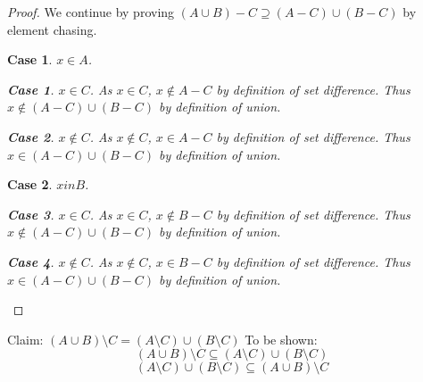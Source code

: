 \documentclass[12pt]{article}
\newtheorem{case}{Case}
\newtheorem{subcase}{Case}
\numberwithin{subcase}{case}
\begin{document}
\begin{proof}
We continue by proving $(A\cup B) - C \supseteq (A - C) \cup (B - C)$ by element chasing.
\begin{case}
$x \in A$. 
\begin{subcase}
  $x \in C$. As $x \in C$, $x \not\in A - C$ by definition of set difference. Thus $x \not\in (A - C) \cup (B
  - C)$ by definition of union.
\end{subcase}
\begin{subcase}
  $x \not\in C$. As $x \not\in C$, $x \in A - C$ by definition of set difference. Thus $x \in (A - C) \cup (B
  - C)$ by definition of union.
\end{subcase}
\end{case}
\begin{case}
  $x in B$.
  \begin{subcase}
    $x \in C$. As $x \in C$, $x \not \in B - C$ by definition of set difference. Thus $x \not\in (A - C) \cup (B
    - C)$ by definition of union.
  \end{subcase}
  \begin{subcase}
    $x \not \in C$. As $x \not \in C$, $x \in B - C$ by definition of set difference. Thus $x \in (A - C) \cup
    (B - C)$ by definition of union.
  \end{subcase}
\end{case}
\end{proof}
\pagebreak{}
Claim: $(A \cup B) \setminus C = (A \setminus C)\cup (B \setminus C)$
To be shown: $$(A \cup B) \setminus C \subseteq (A \setminus C)\cup (B \setminus C)$$
$$(A \setminus C)\cup (B \setminus C) \subseteq (A \cup B) \setminus C$$
\end{document}
